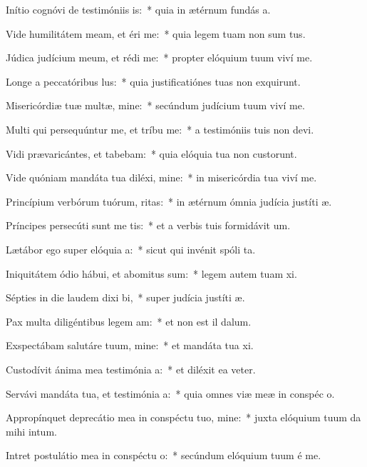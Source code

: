 \item Inítio cognóvi de testimóniis is:~* quia in ætérnum fundás a.
\item Vide humilitátem meam, et éri me:~* quia legem tuam non sum tus.
\item Júdica judícium meum, et rédi me:~* propter elóquium tuum viví me.
\item Longe a peccatóribus lus:~* quia justificatiónes tuas non exquirunt.
\item Misericórdiæ tuæ multæ, mine:~* secúndum judícium tuum viví me.
\item Multi qui persequúntur me, et tríbu me:~* a testimóniis tuis non devi.
\item Vidi prævaricántes, et tabebam:~* quia elóquia tua non custorunt.
\item Vide quóniam mandáta tua diléxi, mine:~* in misericórdia tua viví me.
\item Princípium verbórum tuórum, ritas:~* in ætérnum ómnia judícia justíti æ.
\item Príncipes persecúti sunt me tis:~* et a verbis tuis formidávit  um.
\item Lætábor ego super elóquia a:~* sicut qui invénit spóli ta.
\item Iniquitátem ódio hábui, et abomitus sum:~* legem autem tuam xi.
\item Sépties in die laudem dixi bi,~* super judícia justíti æ.
\item Pax multa diligéntibus legem am:~* et non est il dalum.
\item Exspectábam salutáre tuum, mine:~* et mandáta tua xi.
\item Custodívit ánima mea testimónia a:~* et diléxit ea veter.
\item Servávi mandáta tua, et testimónia a:~* quia omnes viæ meæ in conspéc o.
\item Appropínquet deprecátio mea in conspéctu tuo, mine:~* juxta elóquium tuum da mihi intum.
\item Intret postulátio mea in conspéctu o:~* secúndum elóquium tuum é me.
